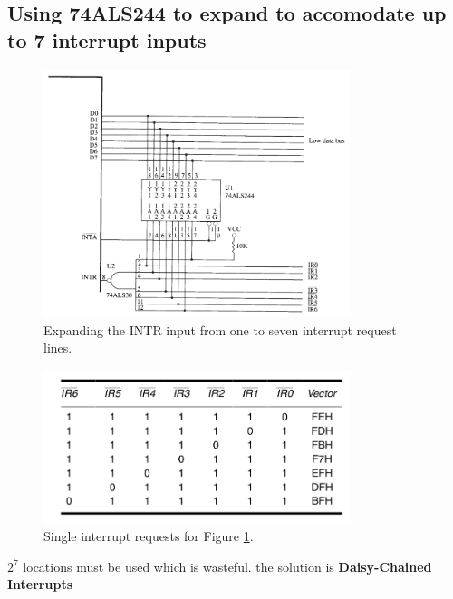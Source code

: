 \subsection{Using 74ALS244 to expand to accomodate up to 7 interrupt inputs}
\begin{figure}[h!]
  \includegraphics[width = 0.8\textwidth]{./figures/INTR_Expand.png}
  \caption{Expanding the INTR input from one to seven interrupt request lines.}
  \label{fig: INTR_Expand}
\end{figure}

\begin{figure}[h!]
  \includegraphics[width = 0.8\textwidth]{./figures/INTR_Table.png}
  \caption{Single interrupt requests for Figure \ref{fig: INTR_Expand}.}

\end{figure}

$2^7$ locations must be used which is wasteful. the solution is \textbf{Daisy-Chained Interrupts}
\newpage
